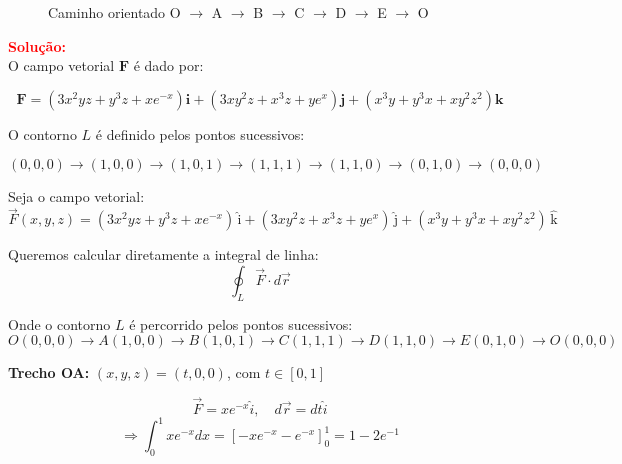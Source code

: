 \documentclass[a4paper,12pt]{article}
\begin{document}
\begin{flushleft}
\begin{figure}[h]
\begin{center}
\caption{Caminho orientado O $\rightarrow$ A $\rightarrow$ B $\rightarrow$ C $\rightarrow$ D $\rightarrow$ E $\rightarrow$ O}
\end{center}
\end{figure}


\textcolor{red}{\textbf{Solução:}}\\

O campo vetorial $\mathbf{F}$ é dado por:

\begin{equation}
\mathbf{F} = (3x^2 yz + y^3 z + x e^{-x}) \mathbf{i} + (3x y^2 z + x^3 z + y e^x) \mathbf{j} + (x^3 y + y^3 x + x y^2 z^2) \mathbf{k}
\end{equation}

O contorno $L$ é definido pelos pontos sucessivos:

\[
(0,0,0) \rightarrow (1,0,0) \rightarrow (1,0,1) \rightarrow (1,1,1) \rightarrow (1,1,0) \rightarrow (0,1,0) \rightarrow (0,0,0)
\]

Seja o campo vetorial:
\begin{equation}
\vec{F}(x,y,z) = (3x^2 y z + y^3 z + x e^{-x})\,\hat{\textrm{i}} + (3x y^2 z + x^3 z + y e^x)\,\hat{\textrm{j}} + (x^3 y + y^3 x + x y^2 z^2)\,\hat{\textrm{k}}
\end{equation}

Queremos calcular diretamente a integral de linha:
\begin{equation}
\oint_L \vec{F} \cdot d\vec{r}
\end{equation}

Onde o contorno $L$ é percorrido pelos pontos sucessivos:
\begin{equation}
O(0,0,0) \to A(1,0,0) \to B(1,0,1) \to C(1,1,1) \to D(1,1,0) \to E(0,1,0) \to O(0,0,0)
\end{equation}

\textbf{Trecho OA:} $(x,y,z) = (t,0,0)$, com $t \in [0,1]$

\begin{equation}
\vec{F} = x e^{-x} \hat{i}, \quad d\vec{r} = dt \hat{i}
\end{equation}
\begin{equation}
\Rightarrow \int_0^1 x e^{-x} dx = \left[ -x e^{-x} - e^{-x} \right]_0^1 = 1 - 2e^{-1}
\end{equation}


\end{flushleft}
\end{document}

